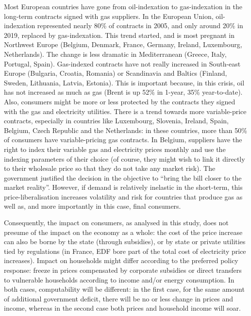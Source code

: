 \documentclass[
  9pt,
  a4paper,
  numbers=noendperiod,
  DIV=12]{scrartcl}
\begin{document}
Most European countries have gone from oil-indexation to gas-indexation
in the long-term contracts signed with gas suppliers. In the European
Union, oil-indexation represented nearly 80\% of contracts in 2005, and
only around 20\% in 2019, replaced by gas-indexation. This trend
started, and is most pregnant in Northwest Europe (Belgium, Denmark,
France, Germany, Ireland, Luxembourg, Netherlands). The change is less
dramatic in Mediterranean (Greece, Italy, Portugal, Spain). Gas-indexed
contracts have not really increased in South-east Europe (Bulgaria,
Croatia, Romania) or Scandinavia and Baltics (Finland, Sweden,
Lithuania, Latvia, Estonia). This is important because, in this crisis,
oil has not increased as much as gas (Brent is up 52\% in 1-year, 35\%
year-to-date). Also, consumers might be more or less protected by the
contracts they signed with the gas and electricity utilities. There is a
trend towards more variable-price contracts, especially in countries
like Luxembourg, Slovenia, Ireland, Spain, Belgium, Czech Republic and
the Netherlands: in these countries, more than 50\% of consumers have
variable-pricing gas contracts. In Belgium, suppliers have the right to
index their variable gas and electricity prices monthly and use the
indexing parameters of their choice (of course, they might wish to link
it directly to their wholesale price so that they do not take any market
risk). The government justified the decision in the objective to ``bring
the bill closer to the market reality''. However, if demand is
relatively inelastic in the short-term, this price-liberalisation
increases volatility and risk for countries that produce gas as well as,
and more importantly in this case, final consumers.

Consequently, the impact on consumers, as analysed in this study, does
not presume of the impact on the economy as a whole: the cost of the
price increase can also be borne by the state (through subsidies), or by
state or private utilities tied by regulations (in France, EDF bore part
of the total cost of electricity price increases). Impact on households
might differ according to the preferred policy response: freeze in
prices compensated by corporate subsidies or direct transfers to
vulnerable households according to income and/or energy consumption. In
both cases, computability will be different: in the first case, for the
same amount of additional government deficit, there will be no or less
change in prices and income, whereas in the second case both prices and
household income will soar.
\end{document}
